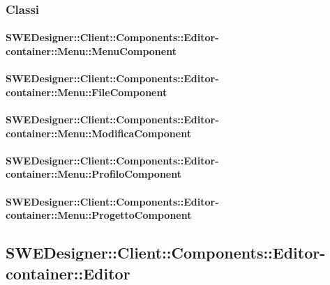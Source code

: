           \subsubsection{Classi}
          
          	\paragraph{SWEDesigner::Client::Components::Editor-container::Menu::MenuComponent}
				
				
          	\paragraph{SWEDesigner::Client::Components::Editor-container::Menu::FileComponent}
				
				
          	\paragraph{SWEDesigner::Client::Components::Editor-container::Menu::ModificaComponent}
				
				
          	\paragraph{SWEDesigner::Client::Components::Editor-container::Menu::ProfiloComponent}
				
				
          	\paragraph{SWEDesigner::Client::Components::Editor-container::Menu::ProgettoComponent}
				
				
	\subsection{SWEDesigner::Client::Components::Editor-container::Editor}
